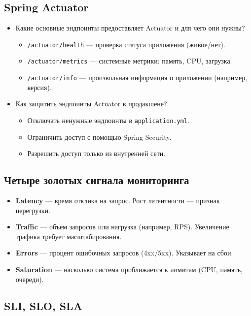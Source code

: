 \documentclass[a4paper,14pt]{article}
\begin{document}
\subsection{Spring Actuator}

\begin{itemize}
\item Какие основные эндпоинты предоставляет Actuator и для чего они нужны?
\begin{itemize}
  \item \texttt{/actuator/health} — проверка статуса приложения (живое/нет).
  \item \texttt{/actuator/metrics} — системные метрики: память, CPU, загрузка.
  \item \texttt{/actuator/info} — произвольная информация о приложении (например, версия).
\end{itemize}

\item Как защитить эндпоинты Actuator в продакшене? \\
\begin{itemize}
  \item Отключать ненужные эндпоинты в \texttt{application.yml}.
  \item Ограничить доступ с помощью Spring Security.
  \item Разрешить доступ только из внутренней сети.
\end{itemize}
\end{itemize}

\subsection{Четыре золотых сигнала мониторинга}

\begin{itemize}
\item \textbf{Latency} — время отклика на запрос. Рост латентности — признак перегрузки.
\item \textbf{Traffic} — объем запросов или нагрузка (например, RPS). Увеличение трафика требует масштабирования.
\item \textbf{Errors} — процент ошибочных запросов (4xx/5xx). Указывает на сбои.
\item \textbf{Saturation} — насколько система приближается к лимитам (CPU, память, очереди).
\end{itemize}

\subsection{SLI, SLO, SLA}
\end{document}

